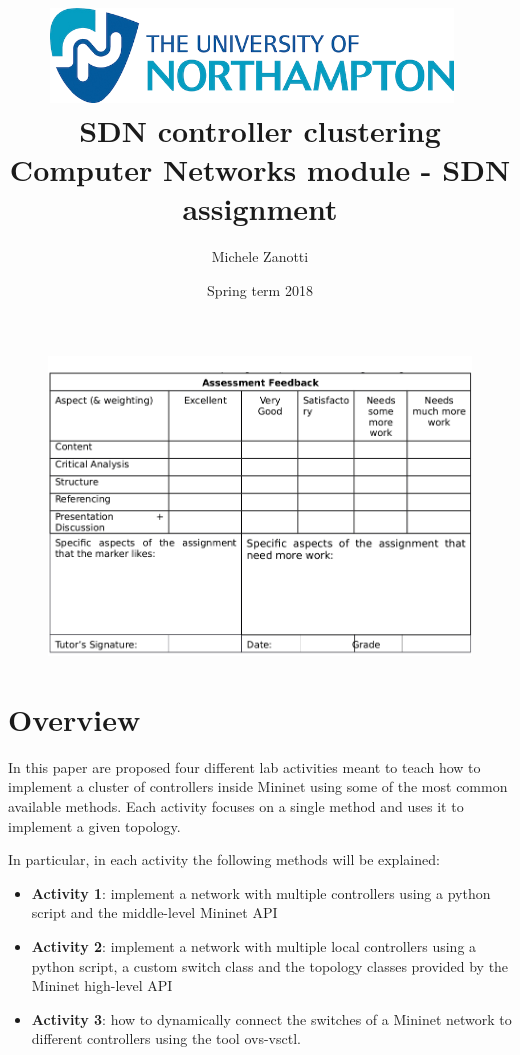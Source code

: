 \documentclass[12pt, a4paper]{article}
\title{
  \includegraphics[width=0.8\textwidth]{img/logo.png}~ \\ 
  SDN controller clustering \\ \large Computer Networks module - SDN assignment
}
\author{Michele Zanotti}
\date{Spring term 2018}
\begin{document}
\maketitle
\begin{figure}[htb]
	\centering
	\includegraphics[width=1\linewidth]{img/valuation-table.png}
\end{figure}

\newpage





\section*{Overview}
In this paper are proposed four different lab activities meant to teach how to implement
a cluster of controllers inside Mininet using some of the most common available methods.
Each activity focuses on a single method and uses it to implement a given topology.

In particular, in each activity the following methods will be explained:
\begin{itemize}
  \item \textbf{Activity 1}: implement a network with multiple controllers using a python
  script and the middle-level Mininet API
  \item \textbf{Activity 2}: implement a network with multiple local controllers using a python
  script, a custom switch class and the topology classes provided by the Mininet high-level API
  \item \textbf{Activity 3}: how to dynamically connect the switches of a Mininet
  network to different controllers using the tool ovs-vsctl.
\end{itemize}
\end{document}
